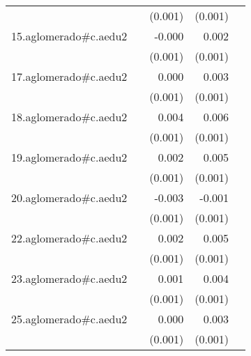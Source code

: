 {\begin{longtable}{l*{4}{D{.}{.}{-1}}}
            &                     &     (0.001)         &     (0.001)         &                     \\
\addlinespace
15.aglomerado#c.aedu2&                     &      -0.000         &       0.002\sym{**} &                     \\
            &                     &     (0.001)         &     (0.001)         &                     \\
\addlinespace
17.aglomerado#c.aedu2&                     &       0.000         &       0.003\sym{**} &                     \\
            &                     &     (0.001)         &     (0.001)         &                     \\
\addlinespace
18.aglomerado#c.aedu2&                     &       0.004\sym{**} &       0.006\sym{***}&                     \\
            &                     &     (0.001)         &     (0.001)         &                     \\
\addlinespace
19.aglomerado#c.aedu2&                     &       0.002         &       0.005\sym{***}&                     \\
            &                     &     (0.001)         &     (0.001)         &                     \\
\addlinespace
20.aglomerado#c.aedu2&                     &      -0.003\sym{*}  &      -0.001         &                     \\
            &                     &     (0.001)         &     (0.001)         &                     \\
\addlinespace
22.aglomerado#c.aedu2&                     &       0.002         &       0.005\sym{***}&                     \\
            &                     &     (0.001)         &     (0.001)         &                     \\
\addlinespace
23.aglomerado#c.aedu2&                     &       0.001         &       0.004\sym{***}&                     \\
            &                     &     (0.001)         &     (0.001)         &                     \\
\addlinespace
25.aglomerado#c.aedu2&                     &       0.000         &       0.003\sym{**} &                     \\
            &                     &     (0.001)         &     (0.001)         &                     \\

\end{longtable}}
